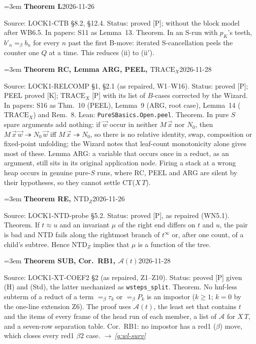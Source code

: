 \documentclass[11pt]{amsart}
\makeatletter
\newcommand{\red}{\twoheadrightarrow}
\newcommand{\conv}{=_\beta}
\newcounter{sense}
\newenvironment{entry}[3]{%
  \par\addvspace{\medskipamount}\noindent\phantomsection
  \def\@currentlabel{#2}\label{#1}\setcounter{sense}{0}\raggedright\emergencystretch=3em%
  \textbf{#2}\hfill{\footnotesize\textsf{#3}}\par\nopagebreak\noindent\ignorespaces}%
  {\par}
\newcommand{\src}[1]{\textsf{Source:} #1.\enskip}
\newcommand{\lean}[1]{\textsf{Lean:} #1.\enskip}
\newcommand{\status}[1]{\textsf{Status:} #1.\enskip}
\newcommand{\appears}[1]{\textsf{In papers:} #1.\enskip}
\renewcommand{\see}[1]{$\rightarrow$\,\emph{\ref{#1}}}
\makeatother
\begin{document}
\begin{entry}{g:wl-theorem-l}{Theorem L}{2026-11-26}
\src{LOCK1-CTB \S8.2, \S12.4}
\status{proved [P]; without the block model after WB6.5}
\appears{S11 as Lemma~13}
Theorem. In an S-run with $p_K$'s teeth, $b'_n\conv b_n$ for every $n$ past the first B-move: iterated
S-cancellation peels the counter one $Q$ at a time. This reduces (ii) to (ii$'$).
\end{entry}

\begin{entry}{g:wl-rc}{Theorem RC, Lemma ARG, PEEL, $\mathrm{TRACE}_X$}{2026-11-28}
\src{LOCK1-RELCOMP \S1, \S2.1 (as repaired, W1--W16)}
\status{proved [P]; PEEL proved [K]; $\mathrm{TRACE}_X$ [P] with its list of $B$-cases corrected by the Wizard}
\appears{S16 as Thm.~10 (PEEL), Lemma~9 (ARG, root case), Lemma~14 ($\mathrm{TRACE}_X$) and Rem.~8}
\lean{\texttt{PureSBasics.Open.peel}}
Theorem. In pure $S$ spare arguments add nothing: if $\vec w$ occur in neither $M\,\vec x$ nor $N_0$, then
$M\,\vec x\,\vec w\red N_0\,\vec w$ iff $M\,\vec x\red N_0$, so there is no relative identity, swap,
composition or fixed-point unfolding; the Wizard notes that leaf-count monotonicity alone gives most of
these. Lemma ARG: a variable that occurs once in a reduct, as an argument, still sits in its original
application node. Firing a stack at a wrong heap occurs in genuine pure-$S$ runs, where RC, PEEL and ARG
are silent by their hypotheses, so they cannot settle CT($X\,T$).
\end{entry}

\begin{entry}{g:wl-theorem-re}{Theorem RE, $\mathrm{NTD}_Z$}{2026-11-26}
\src{LOCK1-NTD-probe \S5.2}
\status{proved [P], as repaired (WN5.1)}
Theorem. If $t\approx u$ and an invariant $\mu$ of the right end differs on $t$ and $u$, the pair is bad
and NTD fails along the rightmost branch of $t^\infty$ or, after one count, of a child's subtree. Hence
$\mathrm{NTD}_Z$ implies that $\mu$ is a function of the tree.
\end{entry}

\begin{entry}{g:wl-theorem-sub}{Theorem SUB, Cor.~RB1, $\mathcal A(t)$}{2026-11-28}
\src{LOCK1-XT-COEF2 \S2 (as repaired, Z1--Z10)}
\status{proved [P] given (H) and (Std), the latter mechanized as \texttt{wsteps\_split}}
Theorem. No hnf-less subterm of a reduct of a term $\conv\tau_k$ or $\conv P_k$ is an impostor ($k\ge1$;
$k=0$ by the one-line extension Z6). The proof uses $\mathcal A(t)$, the least set that contains $t$ and
the items of every frame of the head run of each member, a list of $\mathcal A$ for $X\,T$, and a
seven-row separation table. Cor.~RB1: no impostor has a red1 ($\beta$) move, which closes every red1
$\beta2$ case. \see{g:wl-surv}
\end{entry}
\end{document}
